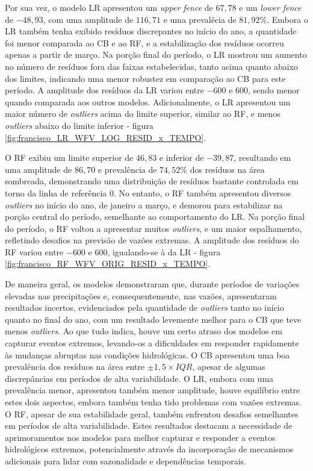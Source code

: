 Por sua vez, o modelo LR apresentou um \textit{upper fence} de $67,78$ e um \textit{lower fence} de $-48,93$, com uma amplitude de $116,71$ e uma prevalêcia de $81,92\%$. Embora o LR também tenha exibido resíduos discrepantes no início do ano, a quantidade foi menor comparada ao CB e ao RF, e a estabilização dos resíduos ocorreu apenas a partir de março. Na porção final do período, o LR mostrou um aumento no número de resíduos fora das faixas estabelecidas, tanto acima quanto abaixo dos limites, indicando uma menor robustez em comparação ao CB para este período. A amplitude dos resíduos da LR variou entre $-600$ e $600$, sendo menor quando comparada aos outros modelos. Adicionalmente, o LR apresentou um maior número de \textit{outliers} acima do limite superior, similar ao RF, e menos \textit{outliers} abaixo do limite inferior - figura \ref{fig:francisco_LR_WFV_LOG_RESID_x_TEMPO}.

O RF exibiu um limite superior de $46,83$ e inferior de $-39,87$, resultando em uma amplitude de $86,70$ e prevalência de $74,52\%$ dos resíduos na área sombreada, demonstrando uma distribuição de resíduos bastante controlada em torno da linha de referência $0$. No entanto, o RF também apresentou diversos \textit{outliers} no início do ano, de janeiro a março, e demorou para estabilizar na porção central do período, semelhante ao comportamento do LR. Na porção final do período, o RF voltou a apresentar muitos \textit{outliers}, e um maior espalhamento, refletindo desafios na previsão de vazões extremas. A amplitude dos resíduos do RF variou entre $-600$ e $600$, igualando-se à da LR - figura \ref{fig:francisco_RF_WFV_ORIG_RESID_x_TEMPO}.

De maneira geral, os modelos demonstraram que, durante períodos de variações elevadas nas precipitações e, consequentemente, nas vazões, apresentaram resultados incertos, evidenciados pela quantidade de \textit{outliers} tanto no início quanto no final do ano, com um resultado levemente melhor para o CB que teve menos \textit{outliers}. Ao que tudo indica, houve um certo atraso dos modelos em capturar eventos extremos, levando-os a dificuldades em responder rapidamente às mudanças abruptas nas condições hidrológicas. O CB apresentou uma boa prevalência dos resíduos na área entre $\pm 1,5 \times IQR$, apesar de algumas discrepâncias em períodos de alta variabilidade. O LR, embora com uma prevalência menor, apresentou também menor amplitude, houve equilíbrio entre estes dois aspectos, embora também tenha tido problemas com vazões extremas. O RF, apesar de sua estabilidade geral, também enfrentou desafios semelhantes em períodos de alta variabilidade. Estes resultados destacam a necessidade de aprimoramentos nos modelos para melhor capturar e responder a eventos hidrológicos extremos, potencialmente através da incorporação de mecanismos adicionais para lidar com sazonalidade e dependências temporais.

